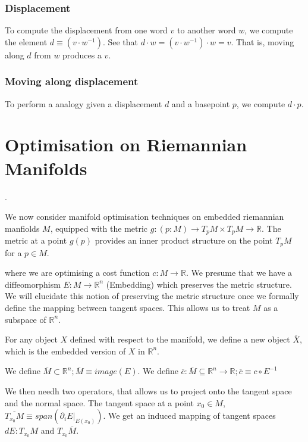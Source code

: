 \documentclass[11pt]{book}
\begin{document}

\subsubsection{Displacement} To compute the displacement from one word $v$ to another word $w$, we compute the element $d \equiv (v \cdot w^{-1})$.
See that $d \cdot w = (v \cdot w^{-1}) \cdot w = v$. That is, moving along $d$ from $w$ produces a $v$.


\subsubsection{Moving along displacement} To perform a analogy given a displacement $d$ and a basepoint $p$, we compute $d \cdot p$.


\section{Optimisation on Riemannian Manifolds}
\label{section:optim-on-riem}.


We now consider manifold optimisation techniques on embedded riemannian manfiolds $M$,
equipped with the metric $g: (p: M) \rightarrow T_p M  \times T_p M \rightarrow \mathbb R$.
The metric at a point $g(p)$ provides an inner product structure on the point $T_pM$
for a $p \in M$.

where we are optimising a cost function $c: M \rightarrow \mathbb R$.
We presume that we have a diffeomorphism $E: M \rightarrow \mathbb R^n$ (Embedding) which
preserves the metric structure. We will elucidate this notion of preserving
the metric structure once we formally define the mapping between tangent spaces.
This allows us to treat $M$ as a subspace of $\mathbb R^n$.

For any object $X$
defined with respect to the manifold, we define a new object $\overline X$, which
is the embedded version of $X$ in $\mathbb R^n$.

We define $\overline M \subset \mathbb R^n; \overline M \equiv image(E)$.
We define $\overline c: \overline M \subseteq \mathbb R^n \rightarrow \mathbb R; \overline c \equiv c \circ E^{-1}$

We then needh two operators, that allows us to project onto the tangent space
and the normal space. The tangent space at a point $x_0 \in M$, $\overline{T_{x_0} M} \equiv span(\partial_i E |_{E(x_0)})$.
We get an induced mapping of tangent spaces $dE: T_{x_0} M$ and $T_{x_0} \overline M$.
\end{document}
